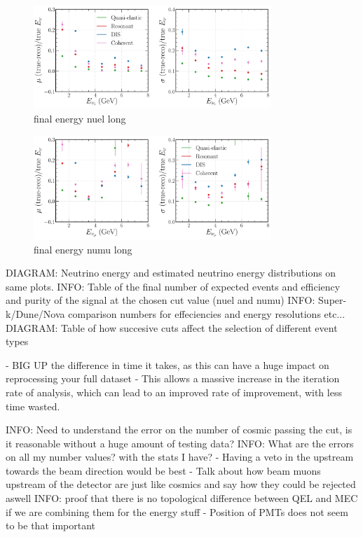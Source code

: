\begin{figure} %
    \includegraphics[width=0.8\textwidth]{diagrams/6-cvn/chipsnet/final_energy_nuel.pdf}
    \caption[final energy nuel short]
    {final energy nuel long}
    \label{fig:final_energy_nuel}
\end{figure}

\begin{figure} %
    \includegraphics[width=0.8\textwidth]{diagrams/6-cvn/chipsnet/final_energy_numu.pdf}
    \caption[final energy numu short]
    {final energy numu long}
    \label{fig:final_energy_numu}
\end{figure}

DIAGRAM: Neutrino energy and estimated neutrino energy distributions on same plots.
INFO: Table of the final number of expected events and efficiency and purity of the signal at the
chosen cut value (nuel and numu)
INFO: Super-k/Dune/Nova comparison numbers for effeciencies and energy resolutions etc...
DIAGRAM: Table of how succesive cuts affect the selection of different event types

- BIG UP the difference in time it takes, as this can have a huge impact on reprocessing your full
dataset
- This allows a massive increase in the iteration rate of analysis, which can lead to an improved
rate of improvement, with less time wasted.

INFO: Need to understand the error on the number of cosmic passing the cut, is it reasonable
without a huge amount of testing data?
INFO: What are the errors on all my number values? with the stats I have?
- Having a veto in the upstream towards the beam direction would be best
- Talk about how beam muons upstream of the detector are just like cosmics and say how they could
be rejected aswell
INFO: proof that there is no topological difference between QEL and MEC if we are combining them
for the energy stuff
- Position of PMTs does not seem to be that important

